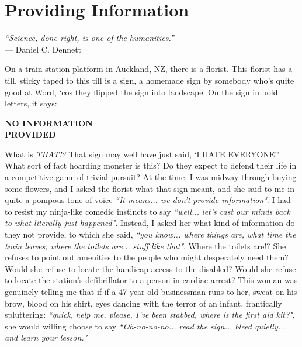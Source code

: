 \chapter{Providing Information}
\begin{flushright}
    \textit{``Science, done right, is one of the humanities.''}
    \\ --- Daniel C. Dennett
\end{flushright}

On a train station platform in Auckland, NZ, there is a florist. This florist has a till, sticky taped to this till is a sign, a homemade sign by somebody who's quite good at Word, `cos they flipped the sign into landscape. On the sign in bold letters, it says:

\begin{center}
\textbf{NO INFORMATION \\ PROVIDED}
\end{center}

What is \textit{THAT!?} That sign may well have just said, `I HATE EVERYONE!' What sort of fact hoarding monster is this? Do they expect to defend their life in a competitive game of trivial pursuit? At the time, I was midway through buying some flowers, and I asked the florist what that sign meant, and she said to me in quite a pompous tone of voice \textit{``It means... we don't provide information"}. I had to resist my ninja-like comedic instincts to say \textit{``well... let's cast our minds back to what literally just happened"}. Instead, I asked her what kind of information do they not provide, to which she said, \textit{``you know... where things are, what time the train leaves, where the toilets are... stuff like that"}. Where the toilets are!? She refuses to point out amenities to the people who might desperately need them? Would she refuse to locate the handicap access to the disabled? Would she refuse to locate the station's defibrillator to a person in cardiac arrest? This woman was genuinely telling me that if if a 47-year-old businessman runs to her, sweat on his brow, blood on his shirt, eyes dancing with the terror of an infant, frantically spluttering: \textit{``quick, help me, please, I've been stabbed, where is the first aid kit?"}, she would willing choose to say \textit{``Oh-no-no-no... read the sign... bleed quietly... and learn your lesson."}




